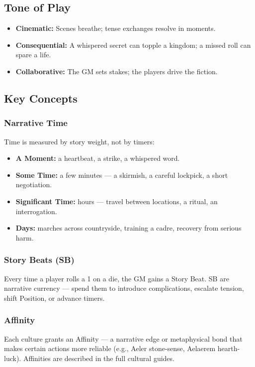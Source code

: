 \subsection{Tone of Play}

\begin{itemize}
  \item \textbf{Cinematic:} Scenes breathe; tense exchanges resolve in moments.
  \item \textbf{Consequential:} A whispered secret can topple a kingdom; a missed roll can spare a life.
  \item \textbf{Collaborative:} The GM sets stakes; the players drive the fiction.
\end{itemize}

\subsection{Key Concepts}

\subsubsection{Narrative Time}
Time is measured by story weight, not by timers:

\begin{itemize}
  \item \textbf{A Moment:} a heartbeat, a strike, a whispered word.
  \item \textbf{Some Time:} a few minutes --- a skirmish, a careful lockpick, a short negotiation.
  \item \textbf{Significant Time:} hours --- travel between locations, a ritual, an interrogation.
  \item \textbf{Days:} marches across countryside, training a cadre, recovery from serious harm.
\end{itemize}

\subsubsection{Story Beats (SB)}
Every time a player rolls a 1 on a die, the GM gains a Story Beat. SB are narrative currency --- spend them to introduce complications, escalate tension, shift Position, or advance timers.

\subsubsection{Affinity}
Each culture grants an Affinity --- a narrative edge or metaphysical bond that makes certain actions more reliable (e.g., Aeler stone-sense, Aelaerem hearth-luck). Affinities are described in the full cultural guides.

